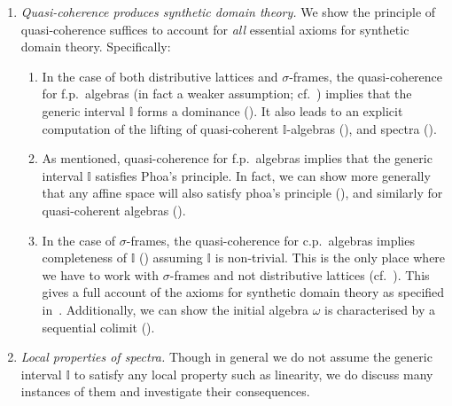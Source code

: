 \documentclass[12pt]{amsart}
\theoremstyle{definition}
\newcommand{\mbb}[1]{\mathbb{#1}}
\newcommand{\I}{\mbb I}
\begin{document}
\begin{enumerate}
  \item \emph{Quasi-coherence produces synthetic domain theory.} We show the principle of quasi-coherence suffices to account for \emph{all} essential axioms for synthetic domain theory. Specifically:
  \begin{enumerate}
    \item\label{contribution:dominance} In the case of both distributive lattices and $\sigma$-frames, the quasi-coherence for f.p.\ algebras (in fact a weaker assumption; cf.\ ) implies that the generic interval $\I$ forms a dominance (). It also leads to an explicit computation of the lifting of quasi-coherent $\I$-algebras (), and spectra ().
    \item As mentioned, quasi-coherence for f.p.\ algebras implies that the generic interval $\I$ satisfies Phoa's principle. In fact, we can show more generally that any affine space will also satisfy phoa's principle (), and similarly for quasi-coherent algebras ().
    \item In the case of $\sigma$-frames, the quasi-coherence for c.p.\ algebras implies completeness of $\I$ () assuming $\I$ is non-trivial.  This is the only place where we have to work with $\sigma$-frames and not distributive lattices (cf.~). This gives a full account of the axioms for synthetic domain theory as specified in~\cite{hyland1990first}.  Additionally, we can show the initial algebra $\omega$ is characterised by a sequential colimit (). 

  \end{enumerate}

  \item \emph{Local properties of spectra.} Though in general we do not assume the generic interval $\I$ to satisfy any local property such as linearity, we do discuss many instances of them and investigate their consequences.
  \begin{enumerate}


\end{enumerate}
\end{enumerate}
\end{document}
